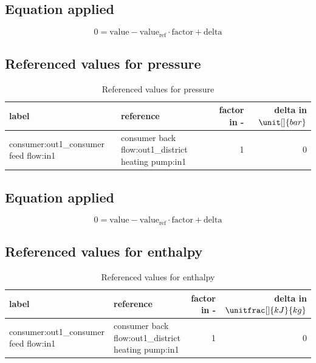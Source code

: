 \subsection{Equation applied}

\begin{equation}
\label{eq:Connection_ref}
0 = \text{value} - \text{value}_\mathrm{ref} \cdot \mathrm{factor} + \text{delta}
\end{equation}

\subsection{Referenced values for pressure}

\begin{table}[H]\begin{center}
\begin{tabular}{llrr}
\toprule
                                 label &                                           reference &  factor in - &  delta in $\unit[]{bar}$ \\
\midrule
 consumer:out1\_consumer feed flow:in1 &  consumer back flow:out1\_district heating pump:in1 &            1 &                        0 \\
\bottomrule
\end{tabular}
\caption{Referenced values for pressure}
\end{center}\end{table}

\subsection{Equation applied}

\begin{equation}
\label{eq:Connection_ref}
0 = \text{value} - \text{value}_\mathrm{ref} \cdot \mathrm{factor} + \text{delta}
\end{equation}

\subsection{Referenced values for enthalpy}

\begin{table}[H]\begin{center}
\begin{tabular}{llrr}
\toprule
                                 label &                                           reference &  factor in - &  delta in $\unitfrac[]{kJ}{kg}$ \\
\midrule
 consumer:out1\_consumer feed flow:in1 &  consumer back flow:out1\_district heating pump:in1 &            1 &                               0 \\
\bottomrule
\end{tabular}
\caption{Referenced values for enthalpy}
\end{center}\end{table}

